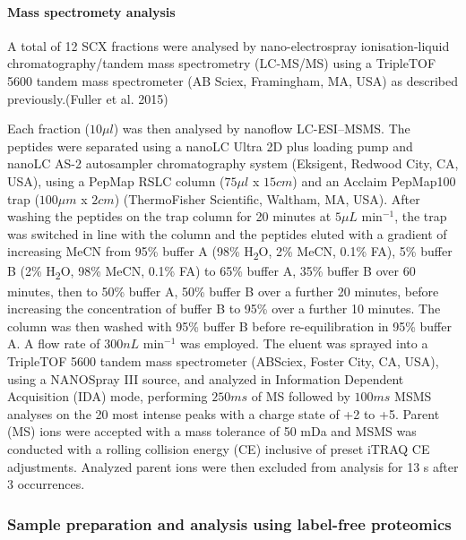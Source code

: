 \documentclass[9pt,lineno]{elife}
\begin{document}
\hypertarget{mass-spectromety-analysis}{%
\paragraph{Mass spectromety analysis}\label{mass-spectromety-analysis}}

A total of 12 SCX fractions were analysed by nano-electrospray ionisation-liquid chromatography/tandem mass spectrometry (LC-MS/MS) using a TripleTOF 5600 tandem mass spectrometer (AB Sciex, Framingham, MA, USA) as described previously.(Fuller et al. 2015)

Each fraction (\(10 \mu l\)) was then analysed by nanoflow LC-ESI--MSMS. The peptides were separated using a nanoLC Ultra 2D plus loading pump and nanoLC AS-2 autosampler chromatography system (Eksigent, Redwood City, CA, USA), using a PepMap RSLC column (\(75\mu l\) x \(15 cm\)) and an Acclaim PepMap100 trap (\(100\mu m\) x \(2 cm\)) (ThermoFisher Scientific, Waltham, MA, USA).
After washing the peptides on the trap column for 20 minutes at \(5\mu L\) min\(^{-1}\), the trap was switched in line with the column and the peptides eluted with a gradient of increasing MeCN from 95\% buffer A (98\% H\textsubscript{2}O, 2\% MeCN, 0.1\% FA), 5\% buffer B (2\% H\textsubscript{2}O, 98\% MeCN, 0.1\% FA) to 65\% buffer A, 35\% buffer B over 60 minutes, then to 50\% buffer A, 50\% buffer B over a further 20 minutes, before increasing the concentration of buffer B to 95\% over a further 10 minutes.
The column was then washed with 95\% buffer B before re-equilibration in 95\% buffer A. A flow rate of \(300 nL\) min\(^{-1}\) was employed. The eluent was sprayed into a TripleTOF 5600 tandem mass spectrometer (ABSciex, Foster City, CA, USA), using a NANOSpray III source, and analyzed in Information Dependent Acquisition (IDA) mode, performing \(250 ms\) of MS followed by \(100 ms\) MSMS analyses on the 20 most intense peaks with a charge state of +2 to +5.
Parent (MS) ions were accepted with a mass tolerance of 50 mDa and MSMS was conducted with a rolling collision energy (CE) inclusive of preset iTRAQ CE adjustments.
Analyzed parent ions were then excluded from analysis for 13 s after 3 occurrences.

\hypertarget{label-free-sample-prep}{%
\subsubsection{Sample preparation and analysis using label-free proteomics}\label{label-free-sample-prep}}
\end{document}
